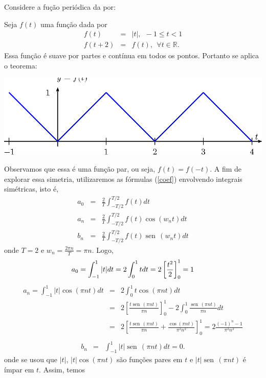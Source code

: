 \documentclass[a4paper,10pt]{book}
\newcommand{\sen}{\operatorname{sen}\,}
\begin{document}
Considere a fução periódica da por:

 Seja $f(t)$ uma função dada por
 \begin{eqnarray*}
 f(t)&=&|t|, \ \ -1\leq t<1\\
 f(t+2)&=&f(t),\ \ \forall t\in\mathbb{R}.
 \end{eqnarray*}
 Essa função é suave por partes e contínua em todos os pontos. Portanto se aplica o teorema:
 \begin{center}
 \includegraphics{figs/cap_series_figura_1}\end{center}
 Observamos que essa é uma função par, ou seja, $f(t)=f(-t)$. A fim de explorar essa simetria, utilizaremos as fórmulas (\ref{coef}) envolvendo integrais simétricas, isto é,
   \begin{eqnarray*}
    a_0&=& \frac{2}{T}\int_{-T/2}^{T/2} f(t)dt\\
    a_n&=&  \frac{2}{T}\int_{-T/2}^{T/2} f(t)\cos(w_nt)dt\\
    b_n&=&\frac{2}{T}\int_{-T/2}^{T/2} f(t)\sen(w_nt)dt
   \end{eqnarray*}
 onde $T=2$ e $w_n=\frac{2\pi n}{T}=\pi n$. Logo,
   \begin{equation*}
    a_0= \int_{-1}^{1} |t| dt=2\int_{0}^{1} t dt=2\left[\frac{t^2}{2}\right]_0^1=1\\
 	\end{equation*}
 	\begin{eqnarray*}
    a_n=  \int_{-1}^{1} |t|\cos(\pi n t)dt&=&2 \int_{0}^{1} t\cos(\pi n t)dt\\&=&2\left[\frac{t\sen(\pi n t)}{\pi n}\right]_0^1-2\int_0^1\frac{\sen(\pi n t)}{\pi n}dt\\
 	&=&2\left[\frac{t\sen(\pi n t)}{\pi n}+\frac{\cos(\pi n t)}{\pi^2 n^2}\right]_0^1=2\frac{(-1)^n-1}{\pi^2n^2}\\
 	 \end{eqnarray*}
 	\begin{eqnarray*}
    b_n&=&\int_{-1}^{1} |t|\sen(\pi n t)dt=0.
   \end{eqnarray*}
 onde se usou que $|t|$, $|t|\cos(\pi n t)$ são funções pares em $t$ e $|t|\sen(\pi n t)$ é ímpar em $t$. Assim, temos
\end{document}
